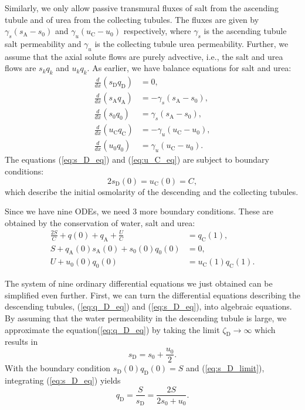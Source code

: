 \documentclass{article}
\numberwithin{equation}{section} %
\begin{document}
Similarly, we only allow passive transmural fluxes of salt from the ascending tubule and of urea from the collecting tubules.
The fluxes are given by $\gamma_s(s_\mathrm{A} - s_0)$ and $\gamma_u(u_\mathrm{C} - u_0)$ respectively, where $\gamma_s$ is the ascending tubule salt permeability and $\gamma_u$ is the collecting tubule urea permeability.
Further, we assume that the axial solute flows are purely advective, i.e., the salt and urea flows are $s_kq_k$ and $u_kq_k$.
As earlier, we have balance equations for salt and urea:
\begin{align}
    \frac{d}{dx}(s_\mathrm{D}q_\mathrm{D}) &= 0,\label{eq:s_D_eq}\\
    \frac{d}{dx}(s_\mathrm{A}q_\mathrm{A}) &= -\gamma_s(s_\mathrm{A} - s_0),\label{eq:s_A_eq}\\
    \frac{d}{dx}(s_\mathrm{0}q_\mathrm{0}) &= \gamma_s(s_\mathrm{A} - s_0),\label{eq:s_0_eq}\\
    \frac{d}{dx}(u_\mathrm{C}q_\mathrm{C}) &= -\gamma_u(u_\mathrm{C} - u_0),\label{eq:u_C_eq}\\
    \frac{d}{dx}(u_\mathrm{0}q_\mathrm{0}) &= \gamma_u(u_\mathrm{C} - u_0).\label{eq:u_0_eq}
\end{align}
The equations (\ref{eq:s_D_eq}) and (\ref{eq:u_C_eq}) are subject to boundary conditions:
\begin{equation}\label{eq:solute_bdry}
    2s_\mathrm{D}(0) = u_\mathrm{C}(0) = C,
\end{equation}
    which describe the initial osmolarity of the descending and the collecting tubules.

Since we have nine ODEs, we need 3 more boundary conditions.
These are obtained by the conservation of water, salt and urea:
\begin{align}
    \frac{2S}{C}+q(0)+q_\mathrm{A}+\frac{U}{C} &= q_\mathrm{C}(1),\label{eq:w_consv}\\
    S+q_\mathrm{A}(0)s_\mathrm{A}(0)+s_0(0)q_0(0) &= 0,\label{eq:s_consv}\\
    U+u_0(0)q_0(0) &= u_\mathrm{C}(1)q_\mathrm{C}(1).\label{eq:u_consv}
\end{align}

The system of nine ordinary differential equations we just obtained can be simplified even further.
First, we can turn the differential equations describing the descending tubules, (\ref{eq:q_D_eq}) and (\ref{eq:s_D_eq}), into algebraic equations.
By assuming that the water permeability in the descending tubule is large, we approximate the equation(\ref{eq:q_D_eq}) by taking the limit $\zeta_\mathrm{D}\to\infty$ which results in
\begin{equation}\label{eq:s_D_limit}
    s_\mathrm{D} = s_0+\frac{u_0}{2}.
\end{equation}
With the boundary condition $s_\mathrm{D}(0)q_\mathrm{D}(0) = S$ and (\ref{eq:s_D_limit}), integrating (\ref{eq:s_D_eq}) yields
\begin{equation}\label{eq:q_D}
    q_\mathrm{D} = \frac{S}{s_\mathrm{D}} = \frac{2S}{2s_0+u_0}.
\end{equation}
\end{document}
